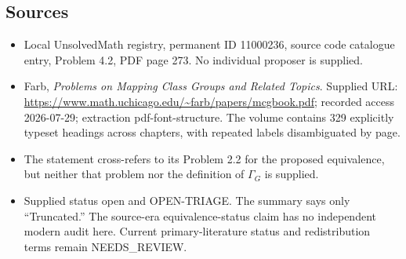 \documentclass[11pt]{article}
\begin{document}
\subsection{Sources}
\begin{itemize}
\item Local UnsolvedMath registry, permanent ID 11000236, source code catalogue entry, Problem 4.2, PDF page 273. No individual proposer is supplied.
\item Farb, \emph{Problems on Mapping Class Groups and Related Topics}. Supplied URL: \url{https://www.math.uchicago.edu/~farb/papers/mcgbook.pdf}; recorded access 2026-07-29; extraction pdf-font-structure. The volume contains 329 explicitly typeset headings across chapters, with repeated labels disambiguated by page.
\item The statement cross-refers to its Problem 2.2 for the proposed equivalence, but neither that problem nor the definition of \(\Gamma_G\) is supplied.
\item Supplied status open and OPEN-TRIAGE. The summary says only ``Truncated.'' The source-era equivalence-status claim has no independent modern audit here. Current primary-literature status and redistribution terms remain NEEDS\_REVIEW.
\end{itemize}
\end{document}
